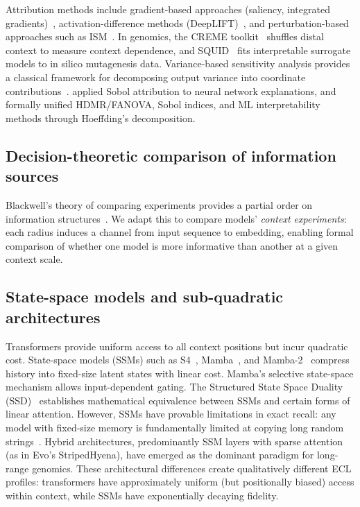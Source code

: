 Attribution methods include gradient-based approaches (saliency, integrated gradients)~\citep{Sundararajan2017IG}, activation-difference methods (DeepLIFT)~\citep{Shrikumar2017DeepLIFT}, and perturbation-based approaches such as ISM~\citep{Nair2022fastISM,Schreiber2022Yuzu}. In genomics, the CREME toolkit~\citep{Toneyan2024CREME} shuffles distal context to measure context dependence, and SQUID~\citep{Seitz2024SQUID} fits interpretable surrogate models to in silico mutagenesis data. Variance-based sensitivity analysis provides a classical framework for decomposing output variance into coordinate contributions~\citep{Saltelli2002Saltelli,Saltelli2010VarianceSA}. \citet{Fel2021Sobol} applied Sobol attribution to neural network explanations, and \citet{Grunert2024Unifying} formally unified HDMR/FANOVA, Sobol indices, and ML interpretability methods through Hoeffding's decomposition.

\subsection{Decision-theoretic comparison of information sources}

Blackwell's theory of comparing experiments provides a partial order on information structures~\citep{Blackwell1951Comparison,Blackwell1953Equivalent}. We adapt this to compare models' \emph{context experiments}: each radius induces a channel from input sequence to embedding, enabling formal comparison of whether one model is more informative than another at a given context scale.

\subsection{State-space models and sub-quadratic architectures}\label{sec:related_ssm}

Transformers provide uniform access to all context positions but incur quadratic cost. State-space models (SSMs) such as S4~\citep{Gu2022S4}, Mamba~\citep{Gu2023Mamba}, and Mamba-2~\citep{Dao2024Mamba2} compress history into fixed-size latent states with linear cost. Mamba's selective state-space mechanism allows input-dependent gating. The Structured State Space Duality (SSD)~\citep{Dao2024Mamba2} establishes mathematical equivalence between SSMs and certain forms of linear attention. However, SSMs have provable limitations in exact recall: any model with fixed-size memory is fundamentally limited at copying long random strings~\citep{Jelassi2024Copying}. Hybrid architectures, predominantly SSM layers with sparse attention (as in Evo's StripedHyena), have emerged as the dominant paradigm for long-range genomics. These architectural differences create qualitatively different ECL profiles: transformers have approximately uniform (but positionally biased) access within context, while SSMs have exponentially decaying fidelity.

